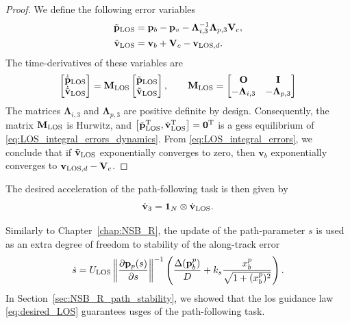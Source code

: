 \begin{proof}
 We define the following error variables 
\begin{subequations}\label{eq:LOS_integral_errors}
 \begin{align}
     \Tilde{\mathbf{p}}_{\rm LOS} &= \mathbf{p}_b-\mathbf{p}_v - \bm{\Lambda}_{i,3}^{-1}\bm{\Lambda}_{p,3} \mathbf{V}_c,\\
     \Tilde{\mathbf{v}}_{\rm LOS} &= \mathbf{v}_b + \mathbf{V}_c - \mathbf{v}_{{\rm LOS}, d}.
 \end{align}
\end{subequations}
The time-derivatives of these variables are
\begin{equation}
    \begin{bmatrix}
        \dot{\Tilde{\mathbf{p}}}_{\rm LOS} \\ \dot{\Tilde{\mathbf{v}}}_{\rm LOS}
    \end{bmatrix} 
    = 
    \mathbf{M}_{\rm LOS}
    \begin{bmatrix}
        \Tilde{\mathbf{p}}_{\rm LOS} \\ \Tilde{\mathbf{v}}_{\rm LOS}
    \end{bmatrix}, 
    \qquad
    \mathbf{M}_{\rm LOS}
    =
    \begin{bmatrix}
        \mathbf{O} & \mathbf{I}\\
        -\mathbf{\Lambda}_{i,3} & -\mathbf{\Lambda}_{p,3}
    \end{bmatrix}
    \label{eq:LOS_integral_errors_dynamics}
\end{equation}
The matrices $\mathbf{\Lambda}_{i,3}$ and $\mathbf{\Lambda}_{p,3}$ are positive definite by design.
Consequently, the matrix $\mathbf{M}_{\rm LOS}$ is Hurwitz, and $\left[\Tilde{\mathbf{p}}_{\rm LOS}^{\mathrm{T}}, \Tilde{\mathbf{v}}_{\rm LOS}^{\mathrm{T}}\right] = \mathbf{0}^{\mathrm{T}}$ is a \glspl{ges} equilibrium of \eqref{eq:LOS_integral_errors_dynamics}.
From \eqref{eq:LOS_integral_errors}, we conclude that if $\Tilde{\mathbf{v}}_{\rm LOS}$ exponentially converges to zero, then $\mathbf{v}_b$ exponentially converges to $\mathbf{v}_{{\rm LOS}, d}-\mathbf{V}_c$.
\end{proof}

The desired acceleration of the path-following task is then given by
\begin{equation}
    \dot{\mathbf{v}}_3 = \mathbf{1}_{N} \otimes \dot{\mathbf{v}}_{\rm LOS}.
\end{equation}

Similarly to Chapter~\ref{chap:NSB_R}, the update of the path-parameter $s$ is used as an extra degree of freedom to stability of the along-track error
\begin{equation}\label{eq:path_update}
    \dot{s} = U_{\rm LOS}\left \| \frac{\partial \mathbf{p}_p(s)}{\partial s}\right \|^{-1} \left (\frac{\Delta(\mathbf{p}_b^p)}{D} +  k_s\frac{x_b^p}{\sqrt{1 + (x_b^p)^2}} \right ).
\end{equation}
In Section~\ref{sec:NSB_R_path_stability}, we showed that the \gls{los} guidance law \eqref{eq:desired_LOS} guarantees \acrfull{usges} of the path-following task.

